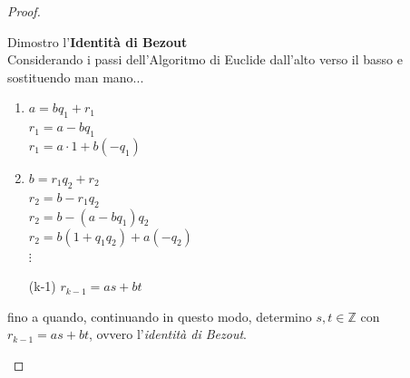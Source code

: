 \documentclass[a4paper,12pt, oneside]{book}
\begin{document}
\begin{proof}
\begin{itemize}
\begin{enumerate}
			            Dimostro l'\textbf{Identità di Bezout}\\
			            Considerando i passi dell'Algoritmo di Euclide dall'alto verso il basso e sostituendo man mano...
			            \begin{enumerate}[label=(\arabic*)]
				            \item $a = bq_1 + r_1$\\
				                  $r_1 = a-bq_1$\\
				                  $r_1 = a \cdot 1 + b(-q_1)$\\
				            \item $b = r_1q_2 + r_2$\\
				                  $r_2 = b-r_1q_2$\\
				                  $r_2 = b-(a-bq_1)q_2$\\
				                  $r_2 = b(1+q_1q_2) + a(-q_2)$\\

				                  $\vdots$

				            \item [(k-1)] $r_{k-1} = as + bt$
			            \end{enumerate}
			            fino a quando, continuando in questo modo, determino $s,t \in \mathbb{Z}$ con $r_{k-1} = as + bt$, ovvero l'\textit{identità di Bezout}.
		      \end{enumerate}
	\end{itemize}
\end{proof}
\end{document}
